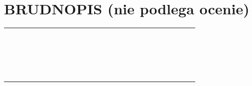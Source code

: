 \documentclass[10pt]{article}
\begin{document}
\section*{BRUDNOPIS (nie podlega ocenie)}
\begin{center}
\begin{tabular}{|c|c|c|c|c|c|c|c|c|c|c|c|c|c|c|c|c|c|c|c|c|c|c|c|}
\hline
 &  &  &  &  &  &  &  &  &  &  &  &  &  &  &  &  &  &  &  &  &  &  &  \\
\hline
 &  &  &  &  &  &  &  &  &  &  &  &  &  &  &  &  &  &  &  &  &  &  &  \\
\hline
 &  &  &  &  &  &  &  &  &  &  &  &  &  &  &  &  &  &  &  &  &  &  &  \\
\hline
 &  &  &  &  &  &  &  &  &  &  &  &  &  &  &  &  &  &  &  &  &  &  &  \\
\hline
 &  &  &  &  &  &  &  &  &  &  &  &  &  &  &  &  &  &  &  &  &  &  &  \\
\hline
 &  &  &  &  &  &  &  &  &  &  &  &  &  &  &  &  &  &  &  &  &  &  &  \\
\hline
 &  &  &  &  &  &  &  &  &  &  &  &  &  &  &  &  &  &  &  &  &  &  &  \\
\hline
 &  &  &  &  &  &  &  &  &  &  &  &  &  &  &  &  &  &  &  &  &  &  &  \\
\hline
 &  &  &  &  &  &  &  &  &  &  &  &  &  &  &  &  &  &  &  &  &  &  &  \\
\hline
 &  &  &  &  &  &  &  &  &  &  &  &  &  &  &  &  &  &  &  &  &  &  &  \\
\hline
 &  &  &  &  &  &  &  &  &  &  &  &  &  &  &  &  &  &  &  &  &  &  &  \\
\hline
 &  &  &  &  &  &  &  &  &  &  &  &  &  &  &  &  &  &  &  &  &  &  &  \\
\hline
 &  &  &  &  &  &  &  &  &  &  &  &  &  &  &  &  &  &  &  &  &  &  &  \\
\hline
 &  &  &  &  &  &  &  &  &  &  &  &  &  &  &  &  &  &  &  &  &  &  &  \\
\hline
 &  &  &  &  &  &  &  &  &  &  &  &  &  &  &  &  &  &  &  &  &  &  &  \\
\hline
 &  &  &  &  &  &  &  &  &  &  &  &  &  &  &  &  &  &  &  &  &  &  &  \\
\hline
 &  &  &  &  &  &  &  &  &  &  &  &  &  &  &  &  &  &  &  &  &  &  &  \\
\hline
 &  &  &  &  &  &  &  &  &  &  &  &  &  &  &  &  &  &  &  &  &  &  &  \\
\hline
 &  &  &  &  &  &  &  &  &  &  &  &  &  &  &  &  &  &  &  &  &  &  &  \\

\end{tabular}
\end{center}
\end{document}
